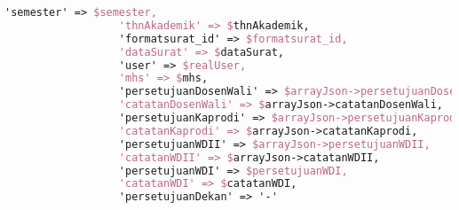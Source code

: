 \begin{lstlisting}[language=tex,basicstyle=\tiny,caption=PesanansuratController.php]
                  'semester' => $semester,
                  'thnAkademik' => $thnAkademik,
                  'formatsurat_id' => $formatsurat_id,
                  'dataSurat' => $dataSurat,
                  'user' => $realUser,
                  'mhs' => $mhs,
                  'persetujuanDosenWali' => $arrayJson->persetujuanDosenWali,
                  'catatanDosenWali' => $arrayJson->catatanDosenWali,
                  'persetujuanKaprodi' => $arrayJson->persetujuanKaprodi,
                  'catatanKaprodi' => $arrayJson->catatanKaprodi,
                  'persetujuanWDII' => $arrayJson->persetujuanWDII,
                  'catatanWDII' => $arrayJson->catatanWDII,
                  'persetujuanWDI' => $persetujuanWDI,
                  'catatanWDI' => $catatanWDI,
                  'persetujuanDekan' => '-'


\end{lstlisting}
